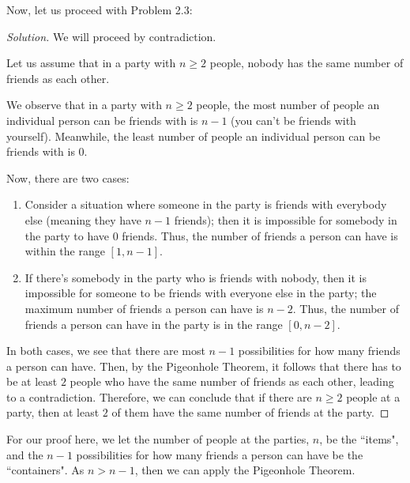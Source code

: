 \documentclass[openany]{book}
\newenvironment{solution}{\begin{proof}[Solution]}{\end{proof}}
\begin{document}
Now, let us proceed with Problem 2.3:
\begin{solution}
	We will proceed by contradiction.
	
	Let us assume that in a party with $n \geq 2$ people, nobody has the same number of friends as each other.
	
	We observe that in a party with $n \geq 2$ people, the most number of people an individual person can be friends with is $n-1$ (you can't be friends with yourself). Meanwhile, the least number of people an individual person can be friends with is $0$.
	
	Now, there are two cases:
	\begin{enumerate}
		\item Consider a situation where someone in the party is friends with everybody else (meaning they have $n-1$ friends); then it is impossible for somebody in the party to have $0$ friends. Thus, the number of friends a person can have is within the range $[1, n-1]$.
		
		\item If there's somebody in the party who is friends with nobody, then it is impossible for someone to be friends with everyone else in the party; the maximum number of friends a person can have is $n-2$. Thus, the number of friends a person can have in the party is in the range $[0,n-2]$.
	\end{enumerate}
	
	In both cases, we see that there are most $n-1$ possibilities for how many friends a person can have. Then, by the Pigeonhole Theorem, it follows that there has to be at least $2$ people who have the same number of friends as each other, leading to a contradiction. Therefore, we can conclude that if there are $n \geq 2$ people at a party, then at least $2$ of them have the same number of friends at the party.
\end{solution}

\begin{rmk}
	For our proof here, we let the number of people at the parties, $n$, be the ``items", and the $n-1$ possibilities for how many friends a person can have be the ``containers". As $n > n-1$, then we can apply the Pigeonhole Theorem.
\end{rmk}
\end{document}
